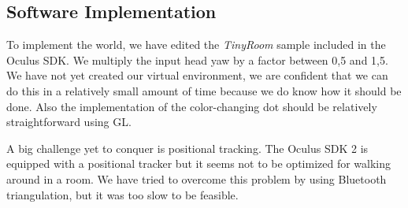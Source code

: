 \subsection{Software Implementation}
To implement the world, we have edited the \textit{TinyRoom} sample included in the Oculus SDK. 
We multiply the input head yaw by a factor between 0,5 and 1,5.
We have not yet created our virtual environment, we are confident that we can do this in a relatively small amount of time because we do know how it should be done.
Also the implementation of the color-changing dot should be relatively straightforward using GL.

A big challenge yet to conquer is positional tracking.
The Oculus SDK 2 is equipped with a positional tracker but it seems not to be optimized for walking around in a room.
We have tried to overcome this problem by using Bluetooth triangulation, but it was too slow to be feasible.